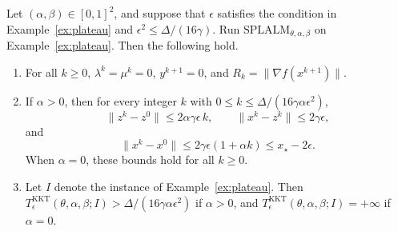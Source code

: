 \begin{lemma}
\label{lem:plateau}
Let \((\alpha,\beta)\in[0,1]^2\), and suppose that \(\epsilon\) satisfies the
condition in Example~\ref{ex:plateau} and \(\epsilon^2\le\Delta/(16\gamma)\).
Run \(\mathrm{SPLALM}_{\theta,\alpha,\beta}\) on Example~\ref{ex:plateau}.
Then the following hold.
\begin{enumerate}[label=(\roman*)]
\item For all \(k\ge0\), \(\lambda^k=\mu^k=0\), \(y^{k+1}=0\), and
  \(R_k=\|\nabla f(x^{k+1})\|\).
\item If \(\alpha>0\), then for every integer \(k\) with \(0\le k\le\Delta/(16\gamma\alpha\epsilon^2)\),
  \[
  \|z^k-z^0\|\le2\alpha\gamma\epsilon\,k,\qquad
  \|x^k-z^k\|\le2\gamma\epsilon,
  \]
  and
  \[
  \|x^k-x^0\|\le2\gamma\epsilon(1+\alpha k)
  \le x_\star-2\epsilon .
  \]
  When \(\alpha=0\), these bounds hold for all \(k\ge0\).
\item Let \(I\) denote the instance of Example~\ref{ex:plateau}. Then
  \(T^{\mathrm{KKT}}_\epsilon(\theta,\alpha,\beta;I)>\Delta/(16\gamma\alpha\epsilon^2)\)
  if \(\alpha>0\), and \(T^{\mathrm{KKT}}_\epsilon(\theta,\alpha,\beta;I)=+\infty\)
  if \(\alpha=0\).
\end{enumerate}
\end{lemma}

